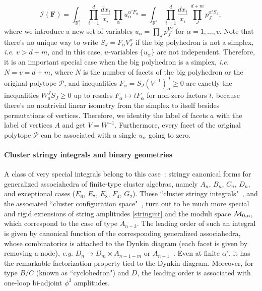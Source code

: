 \documentclass[hidelinks,12pt]{article}
\begin{document}
\begin{equation}
	\mathcal I(\mathbf F)=
	\int_{\mathbb R_+^d} \prod_{i=1}^d \frac{d x_i}{x_i}~%
	\prod_{\alpha}u_\alpha^{\alpha' F_\alpha}
	=
	\int_{\mathbb R_+^d}\prod_{i=1}^d \frac{d x_i}{x_i}~%
	\prod_{J}^{d{+}m} p_J^{\alpha' S_J},
\end{equation}
where we introduce a new set of variables $u_\alpha = \prod_J p_J^{V_J^\alpha}$ for 
$\alpha=1,\dots, v$. Note that there's no unique way to write $S_J=F_\alpha V_J^\alpha$ if the big polyhedron is not a simplex, \textit{i.e.} $v>d+m$, and in this case,
$u$-variables $\{u_\alpha \}$ are not independent. Therefore, it is an important special case when the big polyhedron is a simplex, \textit{i.e.} $N=v=d+m$, where $N$ is 
the number of facets of the big polyhedron or the original polytope $\mathcal P$,
and inequalities $F_\alpha=S_J(V^{-1})^J_\alpha \geq 0$ are exactly the inequalities $W_a^J S_J\geq 0$ up to resales $F_\alpha \mapsto t F_\alpha$ for non-zero factors $t$, because
there's no nontrivial linear isometry from the simplex to itself besides permutations of vertices. Therefore, we identity the label of facets $a$ with the label of 
vertices $A$ and get $V=W^{-1}$. Furthermore, every facet of the original polytope $\mathcal P$ can be associated with a single $u_\alpha$ going to zero. 

\paragraph{Cluster stringy integrals and binary geometries} A class of very special integrals belong to this case~\cite{}: stringy canonical forms for generalized associahedra of finite-type cluster algebras, namely $A_n$, $B_n$, $C_n$, $D_n$, and exceptional cases ($E_6$, $E_7$, $E_8$, $F_4$, $G_2$). These ``cluster stringy integrals"~\cite{}, and the associated ``cluster configuration space"~\cite{}, turn out to be much more special and rigid extensions of string amplitudes \eqref{stringint} and the moduli space ${\cal M}_{0,n}$, which correspond to the case of type $A_{n{-}3}$. The leading order of such an integral is given by canonical function of the corresponding generalized associahedra, whose combinatorics is attached to the Dynkin diagram (each facet is given by removing a node), {\it e.g.} $D_n \to D_m \times A_{n{-}1{-}m}$ or $A_{n{-}1}$~\cite{}. Even at finite $\alpha'$, it has the remarkable factorization property tied to the Dynkin diagram. Moreover, for type $B/C$ (known as ``cyclohedron") and $D$, the leading order is associated with one-loop bi-adjoint $\phi^3$ amplitudes. 
\end{document}

